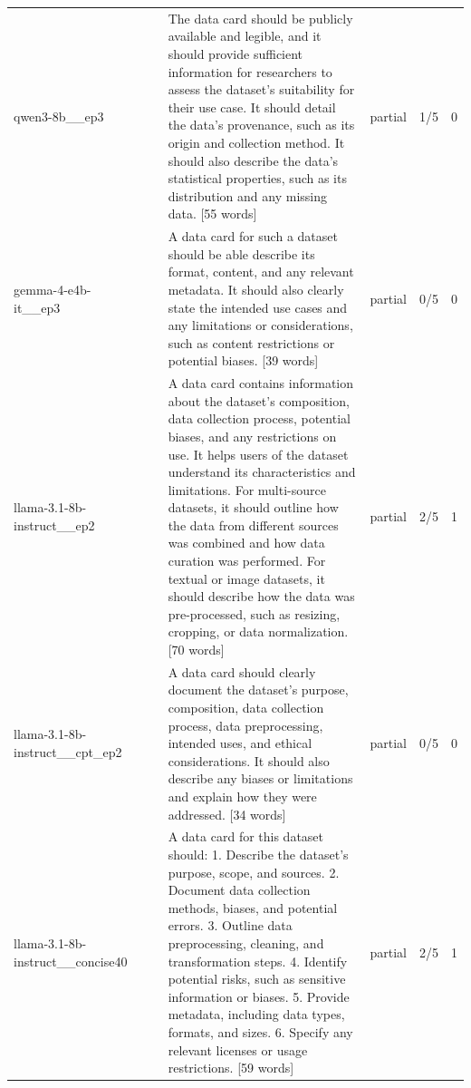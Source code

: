 \begin{longtable}{llllllr}
qwen3-8b\_\_ep3 &  &  & The data card should be publicly available and legible, and it should provide sufficient information for researchers to assess the dataset's suitability for their use case. It should detail the data's provenance, such as its origin and collection method. It should also describe the data's statistical properties, such as its distribution and any missing data. [55 words] & partial & 1/5 & 0 \\
gemma-4-e4b-it\_\_ep3 &  &  & A data card for such a dataset should be able describe its format, content, and any relevant metadata. It should also clearly state the intended use cases and any limitations or considerations, such as content restrictions or potential biases. [39 words] & partial & 0/5 & 0 \\
llama-3.1-8b-instruct\_\_ep2 &  &  & A data card contains information about the dataset's composition, data collection process, potential biases, and any restrictions on use. It helps users of the dataset understand its characteristics and limitations. For multi-source datasets, it should outline how the data from different sources was combined and how data curation was performed. For textual or image datasets, it should describe how the data was pre-processed, such as resizing, cropping, or data normalization. [70 words] & partial & 2/5 & 1 \\
llama-3.1-8b-instruct\_\_cpt\_ep2 &  &  & A data card should clearly document the dataset's purpose, composition, data collection process, data preprocessing, intended uses, and ethical considerations. It should also describe any biases or limitations and explain how they were addressed. [34 words] & partial & 0/5 & 0 \\
llama-3.1-8b-instruct\_\_concise40 &  &  & A data card for this dataset should: 1. Describe the dataset's purpose, scope, and sources. 2. Document data collection methods, biases, and potential errors. 3. Outline data preprocessing, cleaning, and transformation steps. 4. Identify potential risks, such as sensitive information or biases. 5. Provide metadata, including data types, formats, and sizes. 6. Specify any relevant licenses or usage restrictions. [59 words] & partial & 2/5 & 1 \\
\end{longtable}


